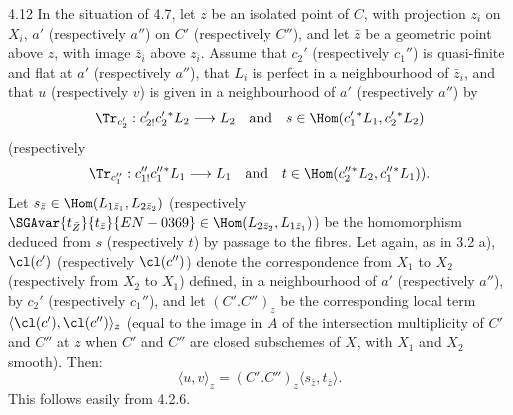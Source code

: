 \begin{statement}{4.12}
In the situation of 4.7, let $z$ be an isolated point of $C$, with projection $z_i$ on $X_i$, $a'$ (respectively $a''$) on $C'$ (respectively $C''$), and let $\bar z$ be a geometric point above $z$, with image $\bar z_i$ above $z_i$. Assume that $c_2'$ (respectively $c_1''$) is quasi-finite and flat at $a'$ (respectively $a''$), that $L_i$ is perfect in a neighbourhood of $\bar z_i$, and that $u$ (respectively $v$) is given in a neighbourhood of $a'$ (respectively $a''$) by
\[
\Tr_{c_2'}:c_{2!}'c_2'{}^*L_2\longrightarrow L_2
\quad\text{and}\quad
s\in\Hom(c_1'{}^*L_1,c_2'{}^*L_2)
\]
(respectively
\[
\Tr_{c_1''}:c_{1!}''c_1''{}^*L_1\longrightarrow L_1
\quad\text{and}\quad
t\in\Hom(c_2''{}^*L_2,c_1''{}^*L_1)).
\]
Let $s_{\bar z}\in\Hom(L_{1\bar z_1},L_{2\bar z_2})$ (respectively $\SGAvar{t_{\bar Z}}{t_{\bar z}}{EN-0369}\in\Hom(L_{2\bar z_2},L_{1\bar z_1})$) be the homomorphism deduced from $s$ (respectively $t$) by passage to the fibres. Let again, as in 3.2 a), $\cl(c')$ (respectively $\cl(c'')$) denote the correspondence from $X_1$ to $X_2$ (respectively from $X_2$ to $X_1$) defined, in a neighbourhood of $a'$ (respectively $a''$), by $c_2'$ (respectively $c_1''$), and let $(C'.C'')_z$ be the corresponding local term $\langle\cl(c'),\cl(c'')\rangle_z$ (equal to the image in $A$ of the intersection multiplicity of $C'$ and $C''$ at $z$ when $C'$ and $C''$ are closed subschemes of $X$, with $X_1$ and $X_2$ smooth). Then:
\begin{equation}
\tag{4.12.1}
\langle u,v\rangle_z=(C'.C'')_z\langle s_{\bar z},t_{\bar z}\rangle.
\end{equation}
This follows easily from 4.2.6.
\end{statement}

